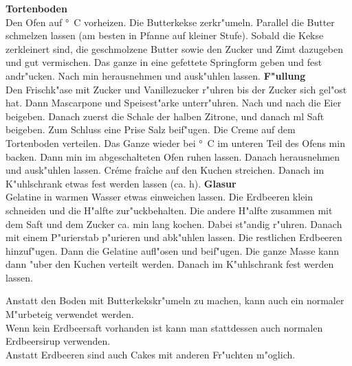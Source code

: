 \begin{recipe}
	\preparation
	{
		\step \textbf{Tortenboden}\\
		Den Ofen auf \unit[175]{°C} vorheizen. Die Butterkekse zerkr"umeln. Parallel die Butter schmelzen lassen (am besten in Pfanne auf kleiner Stufe). Sobald die Kekse zerkleinert sind, die geschmolzene Butter sowie den Zucker und Zimt dazugeben und gut vermischen. Das ganze in eine gefettete Springform geben und fest andr"ucken. Nach \unit[10]{min} herausnehmen und ausk"uhlen lassen.
		\step \textbf{F"ullung} \\
		Den Frischk"ase mit Zucker und Vanillezucker r"uhren bis der Zucker sich gel"ost hat. Dann Mascarpone und Speisest"arke unterr"uhren. Nach und nach die Eier beigeben. Danach zuerst die Schale der halben Zitrone, und danach \unit[15]{ml} Saft beigeben. Zum Schluss eine Prise Salz beif"ugen.
		\step Die Creme auf dem Tortenboden verteilen. Das Ganze wieder bei \unit[175]{°C} im unteren Teil des Ofens \unit[50]{min} backen. Dann \unit[60]{min} im abgeschalteten Ofen ruhen lassen. Danach herausnehmen und ausk"uhlen lassen.
		\step Créme fraîche auf den Kuchen streichen. Danach im K"uhlschrank etwas fest werden lassen (ca. \unit[1-2]{h}). \newpage
		\step \textbf{Glasur}\\
		Gelatine in warmen Wasser etwas einweichen lassen. Die Erdbeeren klein schneiden und die H"alfte zur"uckbehalten. Die andere H"alfte zusammen mit dem Saft und dem Zucker ca. \unit[3]{min}  lang kochen. Dabei st"andig r"uhren. Danach mit einem P"urierstab p"urieren und abk"uhlen lassen. Die restlichen Erdbeeren hinzuf"ugen. Dann die Gelatine aufl"osen und beif"ugen. Die ganze Masse kann dann "uber den Kuchen verteilt werden. Danach im K"uhlschrank fest werden lassen.
	}
	
	\hint
	{
		Anstatt den Boden mit Butterkekskr"umeln zu machen, kann auch ein normaler M"urbeteig verwendet werden. \\
		Wenn kein Erdbeersaft vorhanden ist kann man stattdessen auch normalen Erdbeersirup verwenden.\\
		Anstatt Erdbeeren sind auch Cakes mit anderen Fr"uchten m"oglich.
	}
\end{recipe}